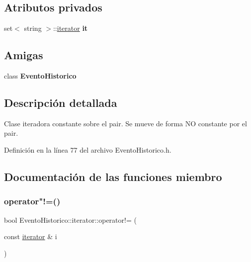 \subsection*{Atributos privados}
\begin{DoxyCompactItemize}
\item 
\hypertarget{classEventoHistorico_1_1iterator_a953d3bb67968065035ba4a69fad3cb11}{}\label{classEventoHistorico_1_1iterator_a953d3bb67968065035ba4a69fad3cb11} 
set$<$ string $>$\+::\hyperlink{classEventoHistorico_1_1iterator}{iterator} {\bfseries it}
\end{DoxyCompactItemize}
\subsection*{Amigas}
\begin{DoxyCompactItemize}
\item 
\hypertarget{classEventoHistorico_1_1iterator_a345fe3c840820562ba48d67773dc5591}{}\label{classEventoHistorico_1_1iterator_a345fe3c840820562ba48d67773dc5591} 
class {\bfseries Evento\+Historico}
\end{DoxyCompactItemize}


\subsection{Descripción detallada}
Clase iteradora constante sobre el pair. Se mueve de forma NO constante por el pair. 

Definición en la línea 77 del archivo Evento\+Historico.\+h.



\subsection{Documentación de las funciones miembro}
\hypertarget{classEventoHistorico_1_1iterator_a1c4c3aa8c2df796c3bbacfe108b628a9}{}\label{classEventoHistorico_1_1iterator_a1c4c3aa8c2df796c3bbacfe108b628a9} 
\subsubsection{\texorpdfstring{operator"!=()}{operator!=()}}
{\footnotesize\ttfamily bool Evento\+Historico\+::iterator\+::operator!= (\begin{DoxyParamCaption}\item[{const \hyperlink{classEventoHistorico_1_1iterator}{iterator} \&}]{i }\end{DoxyParamCaption})\hspace{0.3cm}{\ttfamily [inline]}}



